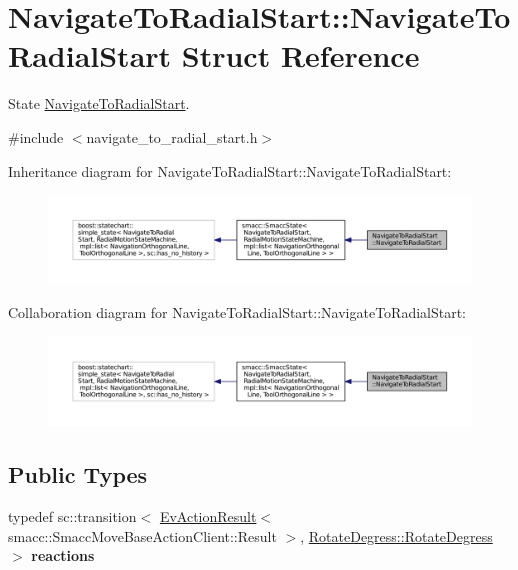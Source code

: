 \hypertarget{structNavigateToRadialStart_1_1NavigateToRadialStart}{}\section{Navigate\+To\+Radial\+Start\+:\+:Navigate\+To\+Radial\+Start Struct Reference}
\label{structNavigateToRadialStart_1_1NavigateToRadialStart}


State \hyperlink{structNavigateToRadialStart_1_1NavigateToRadialStart}{Navigate\+To\+Radial\+Start}.  




{\ttfamily \#include $<$navigate\+\_\+to\+\_\+radial\+\_\+start.\+h$>$}



Inheritance diagram for Navigate\+To\+Radial\+Start\+:\+:Navigate\+To\+Radial\+Start\+:
\nopagebreak
\begin{figure}[H]
\begin{center}
\leavevmode
\includegraphics[width=350pt]{structNavigateToRadialStart_1_1NavigateToRadialStart__inherit__graph}
\end{center}
\end{figure}


Collaboration diagram for Navigate\+To\+Radial\+Start\+:\+:Navigate\+To\+Radial\+Start\+:
\nopagebreak
\begin{figure}[H]
\begin{center}
\leavevmode
\includegraphics[width=350pt]{structNavigateToRadialStart_1_1NavigateToRadialStart__coll__graph}
\end{center}
\end{figure}
\subsection*{Public Types}
\begin{DoxyCompactItemize}
\item 
typedef sc\+::transition$<$ \hyperlink{structsmacc_1_1EvActionResult}{Ev\+Action\+Result}$<$ smacc\+::\+Smacc\+Move\+Base\+Action\+Client\+::\+Result $>$, \hyperlink{structRotateDegress_1_1RotateDegress}{Rotate\+Degress\+::\+Rotate\+Degress} $>$ {\bfseries reactions}\hypertarget{structNavigateToRadialStart_1_1NavigateToRadialStart_a17f989999daba76df5aebd3424e54091}{}\label{structNavigateToRadialStart_1_1NavigateToRadialStart_a17f989999daba76df5aebd3424e54091}

\end{DoxyCompactItemize}
